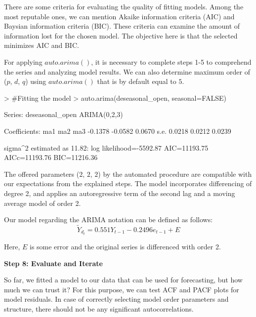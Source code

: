 \documentclass{article}
\begin{document}
There are some criteria for evaluating the quality of fitting models. Among the most reputable ones, we can mention Akaike information criteria (AIC) and Baysian information criteria (BIC). These criteria can examine the amount of information lost for the chosen model. The objective here is that the selected minimizes AIC and BIC.

For applying $auto.arima()$, it is necessary to complete steps 1-5 to comprehend the series and analyzing model results. We can also determine maximum order of ($p$, $d$, $q$) using $auto.arima()$ that  is by default equal to $5$.
\begin{Schunk}
\begin{Sinput}
> #Fitting the model
> auto.arima(deseasonal_open, seasonal=FALSE)
\end{Sinput}
\begin{Soutput}
Series: deseasonal_open 
ARIMA(0,2,3) 

Coefficients:
          ma1      ma2     ma3
      -0.1378  -0.0582  0.0670
s.e.   0.0218   0.0212  0.0239

sigma^2 estimated as 11.82:  log likelihood=-5592.87
AIC=11193.75   AICc=11193.76   BIC=11216.36
\end{Soutput}
\end{Schunk}

The offered parameters ($2$, $2$, $2$) by the automated procedure are compatible with our expectations from the explained steps. The model incorporates differencing of degree 2, and applies an autoregressive term of the second lag and a moving average model of order 2.

Our model regarding the ARIMA notation can be defined as follows:
\begin{equation}
\tilde{Y}_{d_t}=0.551Y_{t-1}-0.2496e_{t-1}+E
\end{equation}

Here, $E$ is some error and the original series is differenced with order 2.

\textbf{Step 8: Evaluate and Iterate}

So far, we fitted a model to our data that can be used for forecasting, but how much we can trust it? For this purpose, we can test ACF and PACF plots for model residuals.  In case of correctly selecting model order parameters and structure, there should not be any significant autocorrelations.
\end{document}
